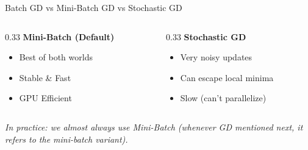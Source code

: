 \begin{frame}{Batch GD vs Mini-Batch GD vs Stochastic GD}
\begin{columns}[t]
        \begin{column}{0.33\textwidth}
            \textbf{Mini-Batch (Default)}
            \footnotesize
            \begin{itemize}
                \item Best of both worlds
                \item Stable \& Fast
                \item GPU Efficient
            \end{itemize}
        \end{column}
        
        \begin{column}{0.33\textwidth}
            \textbf{Stochastic GD}
            \footnotesize
            \begin{itemize}
                \item Very noisy updates
                \item Can escape local minima
                \item Slow (can't parallelize)
            \end{itemize}
        \end{column}
    \end{columns}
    
    \vspace{0.5em}
    \centering
    \small \textit{In practice: we almost always use Mini-Batch (whenever GD mentioned next, it refers to the mini-batch variant).}
\end{frame}

